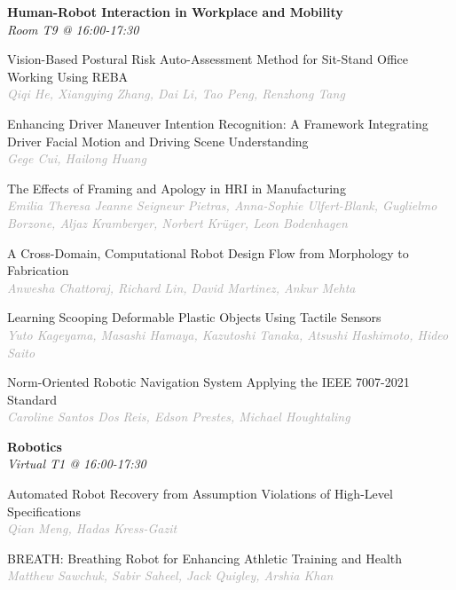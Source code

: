 \begin{multicols*}{2}
\normalsize \textbf{Human-Robot Interaction in Workplace and Mobility}\\
\small \textit{Room T9 @ 16:00-17:30}

\small Vision-Based Postural Risk Auto-Assessment Method for Sit-Stand Office Working Using REBA\\ 
\footnotesize \textcolor{darkgray}{\textit{Qiqi He, Xiangying  Zhang, Dai  Li, Tao  Peng, Renzhong  Tang}}

\small Enhancing Driver Maneuver Intention Recognition: A Framework Integrating Driver Facial Motion and Driving Scene Understanding\\ 
\footnotesize \textcolor{darkgray}{\textit{Gege Cui, Hailong  Huang}}

\small The Effects of Framing and Apology in HRI in Manufacturing\\ 
\footnotesize \textcolor{darkgray}{\textit{Emilia Theresa Jeanne Seigneur Pietras, Anna-Sophie  Ulfert-Blank, Guglielmo  Borzone, Aljaz  Kramberger, Norbert  Krüger, Leon  Bodenhagen}}

\small A Cross-Domain, Computational Robot Design Flow from Morphology to Fabrication\\ 
\footnotesize \textcolor{darkgray}{\textit{Anwesha Chattoraj, Richard  Lin, David  Martinez, Ankur  Mehta}}

\small Learning Scooping Deformable Plastic Objects Using Tactile Sensors\\ 
\footnotesize \textcolor{darkgray}{\textit{Yuto Kageyama, Masashi  Hamaya, Kazutoshi  Tanaka, Atsushi  Hashimoto, Hideo  Saito}}

\small Norm-Oriented Robotic Navigation System Applying the IEEE 7007-2021 Standard\\ 
\footnotesize \textcolor{darkgray}{\textit{Caroline Santos Dos Reis, Edson  Prestes, Michael  Houghtaling}}

\normalsize \textbf{Robotics}\\
\small \textit{Virtual T1 @ 16:00-17:30}

\small Automated Robot Recovery from Assumption Violations of High-Level Specifications\\ 
\footnotesize \textcolor{darkgray}{\textit{Qian Meng, Hadas  Kress-Gazit}}

\small BREATH: Breathing Robot for Enhancing Athletic Training and Health\\ 
\footnotesize \textcolor{darkgray}{\textit{Matthew Sawchuk, Sabir  Saheel, Jack  Quigley, Arshia  Khan}}


\end{multicols*}
